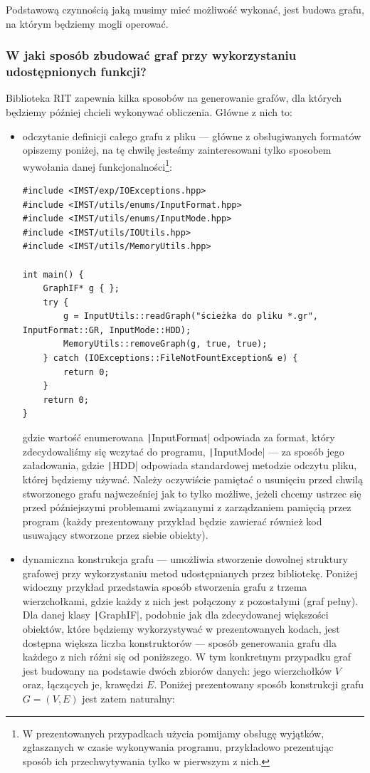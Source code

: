 Podstawową czynnością jaką musimy mieć możliwość wykonać, jest budowa grafu, na którym będziemy mogli operować. 

\subsubsection{W jaki sposób zbudować graf przy wykorzystaniu udostępnionych funkcji?}

Biblioteka \textsc{RIT} zapewnia kilka sposobów na generowanie grafów, dla których będziemy później chcieli wykonywać obliczenia. Główne z nich to:
\begin{itemize}
	\item odczytanie definicji całego grafu z pliku --- główne z obsługiwanych formatów opiszemy poniżej, na tę chwilę jesteśmy zainteresowani tylko sposobem wywołania danej funkcjonalności\footnote{W prezentowanych przypadkach użycia pomijamy obsługę wyjątków, zgłaszanych w czasie wykonywania programu, przykładowo prezentując sposób ich przechwytywania tylko w pierwszym z nich.}:
	
	\begin{verbatim}
#include <IMST/exp/IOExceptions.hpp>
#include <IMST/utils/enums/InputFormat.hpp>
#include <IMST/utils/enums/InputMode.hpp>
#include <IMST/utils/IOUtils.hpp>
#include <IMST/utils/MemoryUtils.hpp>

int main() {
	GraphIF* g { };
	try {
		g = InputUtils::readGraph("ścieżka do pliku *.gr", InputFormat::GR, InputMode::HDD);
		MemoryUtils::removeGraph(g, true, true);
	} catch (IOExceptions::FileNotFountException& e) {
		return 0;
	}
	return 0;
}
	\end{verbatim}
	
	gdzie wartość enumerowana \texttt|InputFormat| odpowiada za format, który zdecydowaliśmy się wczytać do programu, \texttt|InputMode| --- za sposób jego załadowania, gdzie \texttt|HDD| odpowiada standardowej metodzie odczytu pliku, której będziemy używać. Należy oczywiście pamiętać o usunięciu przed chwilą stworzonego grafu najwcześniej jak to tylko możliwe, jeżeli chcemy ustrzec się przed późniejszymi problemami związanymi z zarządzaniem pamięcią przez program (każdy prezentowany przykład będzie zawierać również kod usuwający stworzone przez siebie obiekty).
	
	\item dynamiczna konstrukcja grafu --- umożliwia stworzenie dowolnej struktury grafowej przy wykorzystaniu metod udostępnianych przez bibliotekę. Poniżej widoczny przykład przedstawia sposób stworzenia grafu z trzema wierzchołkami, gdzie każdy z nich jest połączony z pozostałymi (graf pełny). Dla danej klasy \texttt|GraphIF|, podobnie jak dla zdecydowanej większości obiektów, które będziemy wykorzystywać w prezentowanych kodach, jest dostępna większa liczba konstruktorów --- sposób generowania grafu dla każdego z nich różni się od poniższego. W tym konkretnym przypadku graf jest budowany na podstawie dwóch zbiorów danych: jego wierzchołków $V$ oraz, łączących je, krawędzi $E$. Poniżej prezentowany sposób konstrukcji grafu $G = \left( V, E \right)$ jest zatem naturalny:
	

\end{itemize}
